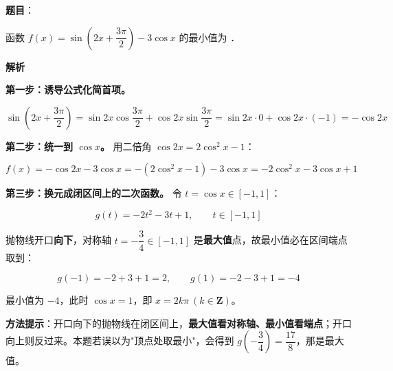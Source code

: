 \begin{answer}

\textbf{题目}：

函数 $f(x)=\sin\left(2x+\dfrac{3\pi}2\right)-3\cos x$ 的最小值为 \gkblank{}．

\textbf{解析}

\textbf{第一步：诱导公式化简首项。}

\nopagebreak[4]
\[\sin\left(2x+\frac{3\pi}2\right)=\sin2x\cos\frac{3\pi}2+\cos2x\sin\frac{3\pi}2=\sin2x\cdot0+\cos2x\cdot(-1)=-\cos2x\]

\textbf{第二步：统一到 $\cos x$。} 用二倍角 $\cos2x=2\cos^{2}x-1$：

\nopagebreak[4]
\[f(x)=-\cos2x-3\cos x=-\left(2\cos^{2}x-1\right)-3\cos x=-2\cos^{2}x-3\cos x+1\]

\textbf{第三步：换元成闭区间上的二次函数。} 令 $t=\cos x\in[-1,1]$：

\nopagebreak[4]
\[g(t)=-2t^{2}-3t+1,\qquad t\in[-1,1]\]

抛物线开口\textbf{向下}，对称轴 $t=-\dfrac34\in[-1,1]$ 是\textbf{最大值}点，故最小值必在区间端点取到：

\nopagebreak[4]
\[g(-1)=-2+3+1=2,\qquad g(1)=-2-3+1=-4\]

最小值为 $-4$，此时 $\cos x=1$，即 $x=2k\pi\ (k\in\mathbf Z)$。

\begin{gktip}
\textbf{方法提示}：开口向下的抛物线在闭区间上，\textbf{最大值看对称轴、最小值看端点}；开口向上则反过来。本题若误以为"顶点处取最小"，会得到 $g\left(-\dfrac34\right)=\dfrac{17}8$，那是最大值。
\end{gktip}


\par\medskip

\end{answer}
